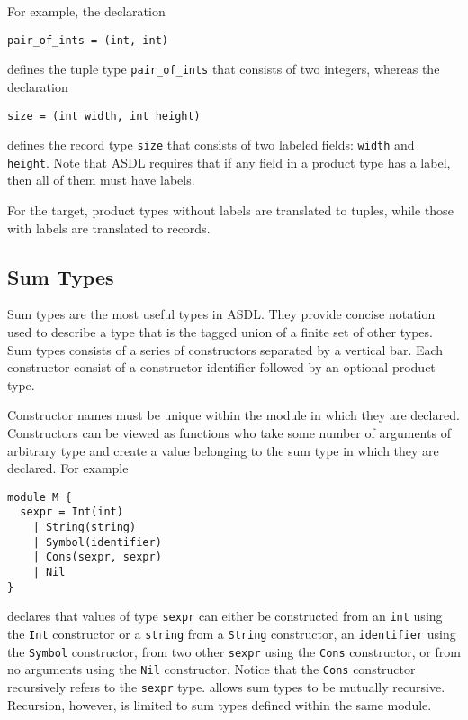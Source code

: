 For example, the declaration
\begin{code}\begin{lstlisting}[language=ASDL] 
pair_of_ints = (int, int) 
\end{lstlisting}\end{code}%
defines the tuple type \lstinline[language=ASDL]!pair_of_ints! that consists of two integers,
whereas the declaration
\begin{code}\begin{lstlisting}[language=ASDL] 
size = (int width, int height) 
\end{lstlisting}\end{code}%
defines the record type \lstinline[language=ASDL]!size! that consists of two
labeled fields: \lstinline[language=ASDL]@width@ and \lstinline[language=ASDL]@height@.
Note that ASDL requires that if any field in a product type has a label, then all
of them must have labels.

For the \sml{} target, product types without labels are translated to tuples, while
those with labels are translated to records.

\subsection{Sum Types}

Sum types are the most useful types in ASDL. They provide concise notation
used to describe a type that is the tagged union of a finite set of other
types.  Sum types consists of a series of constructors separated by a
vertical bar. Each constructor consist of a constructor identifier followed
by an optional product type. 

Constructor names must be unique within the module in which they are
declared. Constructors can be viewed as functions who take some number of
arguments of arbitrary type and create a value belonging to the sum type in
which they are declared.
For example
\begin{code}\begin{lstlisting}[language=ASDL]
module M {
  sexpr = Int(int)
	| String(string)
	| Symbol(identifier)
	| Cons(sexpr, sexpr)
	| Nil
}
\end{lstlisting}\end{code}%
declares that values of type \lstinline[language=ASDL]!sexpr! can either be
constructed from an \lstinline[language=ASDL]!int! using the
\lstinline[language=ASDL]!Int! constructor or a \lstinline[language=ASDL]!string!
from a \lstinline[language=ASDL]!String! constructor, an
\lstinline[language=ASDL]!identifier! using the \lstinline[language=ASDL]!Symbol!
constructor, from two other \lstinline[language=ASDL]!sexpr! using the
\lstinline[language=ASDL]!Cons! constructor, or from no arguments
using the \lstinline[language=ASDL]!Nil! constructor.
Notice that the \lstinline[language=ASDL]!Cons! constructor
recursively refers to the \lstinline[language=ASDL]!sexpr! type.
\asdl{} allows sum types to be mutually recursive.
Recursion, however, is limited to sum types defined within the same module.

